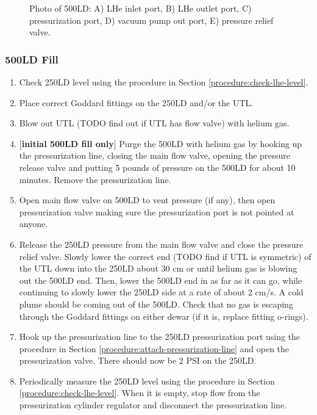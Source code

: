 \begin{figure}[h]
\begin{minipage}{.50\textwidth}
 \caption{Photo of 500LD: A) LHe inlet port, B) LHe outlet port, C) pressurization port, D) vacuum pump out port, E) pressure relief valve.}
 \label{fig:500LD-cartoon}
 \end{minipage}
 \end{figure}




\subsubsection{500LD Fill}
\label{practical-op:500LDfill}
\begin{enumerate}
 \item Check 250LD level using the procedure in Section \ref{procedure:check-lhe-level}.
 \item Place correct Goddard fittings on the 250LD and/or the UTL.
 \item Blow out UTL (TODO find out if UTL has flow valve) with helium gas.
 \item $[$\textbf{initial 500LD fill only}$]$ Purge the 500LD with helium gas by hooking up the pressurization line, closing the main flow valve, opening the pressure release valve and putting 5 pounds of pressure on the 500LD for about 10 minutes.  Remove the pressurization line.%
 \item Open main flow valve on 500LD to vent pressure (if any), then open pressurization valve making sure the pressurization port is not pointed at anyone.
 \item Release the 250LD pressure from the main flow valve and close the pressure relief valve.  Slowly lower the correct end (TODO find if UTL is symmetric) of the UTL down into the 250LD about 30 cm or until helium gas is blowing out the 500LD end.  Then, lower the 500LD end in as far as it can go, while continuing to slowly lower the 250LD side at a rate of about 2 cm/s.  A cold plume should be coming out of the 500LD.  Check that no gas is escaping through the Goddard fittings on either dewar (if it is, replace fitting o-rings).
 \item Hook up the pressurization line to the 250LD pressurization port using the procedure in Section \ref{procedure:attach-pressurization-line} and open the pressurization valve.  There should now be 2 PSI on the 250LD.
 \item Periodically measure the 250LD level using the procedure in Section \ref{procedure:check-lhe-level}.  When it is empty, stop flow from the pressurization cylinder regulator and disconnect the pressurization line.

\end{enumerate}
